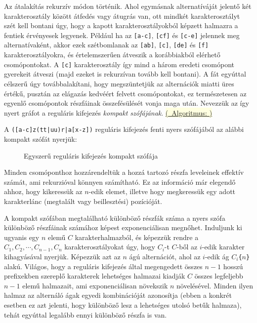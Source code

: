 \documentclass[
    parspace,
    noindent,
    nohyp,
]{elteiktdk}[2023/04/10]
\newcommand{\algorithmref}[1]{\hyperref[algorithm:#1]{\colorbox{lightyellow}{%
(\textrightarrow~Algoritmus: \nameref*{algorithm:#1})}}}
\newcommand{\regextt}[1]{\texttt{\colorbox{verylightgray}{#1}}}
\begin{document}
Az átalakítás rekurzív módon történik.
Ahol egymásnak alternatíváját jelentő két karakterosztály között átfedés vagy átugrás van,
ott mindkét karakterosztályt szét kell bontani úgy,
hogy a kapott karakterosztályokból képzett halmazra a fentiek érvényesek legyenek.
Például ha az \regextt{[a-c]}, \regextt{[cf]} és \regextt{[c-e]} jelennek meg alternatívaként,
akkor ezek szétbomlanak az \regextt{[ab]}, \regextt{[c]}, \regextt{[de]} és \regextt{[f]}
karakterosztályokra, és értelemszerűen átveszik a korábbiakból elérhető csomópontokat.
A \regextt{[c]} karakterosztály így mind a három eredeti csomópont gyerekeit átveszi
(majd ezeket is rekurzívan tovább kell bontani).
A fát egyúttal célszerű úgy továbbalakítani, hogy megszüntetjük az alternációk miatti üres értékű,
pusztán az elágazás kedvéért felvett csomópontokat,
ez természetesen az egyenlő csomópontok részfáinak összefésülését vonja maga után.
Nevezzük az így nyert gráfot a reguláris kifejezés \textit{kompakt szófájának}.
\algorithmref{regex_wordtree_create_compact}

A \regextt{([a-c]z(tt|uu)r|a[x-z])} reguláris kifejezés fenti nyers szófájából
az alábbi kompakt szófát nyerjük:

\begin{figure}[H]
\centering

\caption{Egyszerű reguláris kifejezés kompakt szófája}
\end{figure}

Minden csomóponthoz hozzárendeltük a hozzá tartozó részfa leveleinek effektív számát,
ami rekurzióval könnyen számítható.
Ez az információ már elegendő ahhoz, hogy kikeressük az $n$-edik elemet,
illetve hogy megkeressük egy adott karakterlánc (megtalált vagy beillesztési) pozícióját.

A kompakt szófában megtalálható különböző részfák száma
a nyers szófa különböző részfáinak számához képest exponenciálisan megnőhet.
Induljunk ki ugyanis egy $n$ elemű $C$ karakterhalmazból,
és képezzük rendre a $C_1, C_2, \cdots, C_{n-1}, C_n$ karakterosztályokat úgy,
hogy $C_i$-t $C$-ből az $i$-edik karakter kihagyásával nyerjük.
Képezzük azt az $n$ ágú alternációt,
ahol az $i$-edik ág $C_i$\texttt{\{}$n$\texttt{\}} alakú.
Világos, hogy a reguláris kifejezés által megengedett összes $n-1$ hosszú prefixekben
szereplő karakterek lehetséges halmazai kiadják
$C$ összes legfeljebb $n-1$ elemű halmazait,
ami exponenciálisan növekszik $n$ növelésével.
Minden ilyen halmaz az alternáló ágak egyedi kombinációját azonosítja
(ebben a konkrét esetben ez azt jelenti, hogy különböző lesz a lehetséges utolsó betűk halmaza),
tehát egyúttal legalább ennyi különböző részfa is van.
\end{document}
